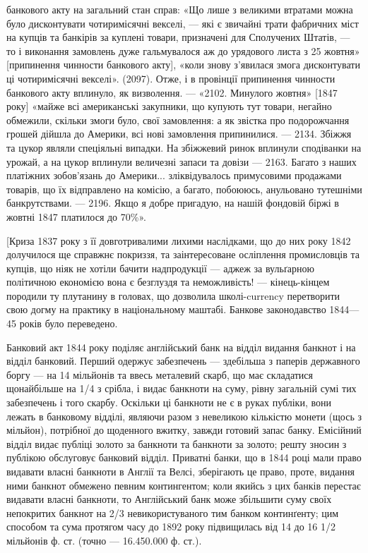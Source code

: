 банкового акту на загальний стан справ: «Що лише з великими втратами можна
було дисконтувати чотиримісячні векселі, — які є звичайні трати фабричних міст
на купців та банкірів за куплені товари, призначені для Сполучених Штатів, —
то і виконання замовлень дуже гальмувалося аж до урядового листа з 25 жовтня»
[припинення чинности банкового акту], «коли знову з’явилася змога дисконтувати
ці чотиримісячні векселі». (2097). Отже, і в провінції припинення чинности
банкового акту вплинуло, як визволення. — «2102. Минулого жовтня»
[1847 року] «майже всі американські закупники, що купують тут товари, негайно
обмежили, скільки змоги було, свої замовлення: а як звістка про подорожчання
грошей дійшла до Америки, всі нові замовлення припинилися. — 2134.
Збіжжя та цукор являли спеціяльні випадки. На збіжжевий ринок вплинули
сподіванки на урожай, а на цукор вплинули величезні запаси та довізи — 2163.
Багато з наших платіжних зобов’язань до Америки... зліквідувалось примусовими
продажами товарів, що їх відправлено на комісію, а багато, побоююсь,
анульовано тутешніми банкрутствами. — 2196. Якщо я добре пригадую, на нашій
фондовій біржі в жовтні 1847 платилося до 70\%».

[Криза 1837 року з її довготривалими лихими наслідками, що до них
року 1842 долучилося ще справжнє покриззя, та заінтересоване осліплення
промисловців та купців, що ніяк не хотіли бачити надпродукції — аджеж за
вульґарною політичною економією вона є безглуздя та неможливість! — кінець-кінцем
породили ту плутанину в головах, що дозволила школі-currency перетворити
свою догму на практику в національному маштабі. Банкове законодавство
1844—45 років було переведено.

Банковий акт 1844 року поділяє англійський банк на відділ видання банкнот
і на відділ банковий. Перший одержує забезпечень — здебільша з паперів державного
боргу — на 14 мільйонів та ввесь металевий скарб, що має складатися
щонайбільше на 1/4 з срібла, і видає банкноти на суму, рівну загальній сумі
тих забезпечень і того скарбу. Оскільки ці банкноти не є в руках публіки, вони
лежать в банковому відділі, являючи разом з невеликою кількістю монети (щось
з мільйон), потрібної до щоденного вжитку, завжди готовий запас банку. Емісійний
відділ видає публіці золото за банкноти та банкноти за золото; решту
зносин з публікою обслуговує банковий відділ. Приватні банки, що в 1844 році
мали право видавати власні банкноти в Англії та Велсі, зберігають це право,
проте, видання ними банкнот обмежено певним контингентом; коли якийсь з цих
банків перестає видавати власні банкноти, то Англійський банк може збільшити
суму своїх непокритих банкнот на 2/3 невикористуваного тим банком континґенту;
цим способом та сума протягом часу до 1892 року підвищилась від 14 до 16 1/2
мільйонів ф. ст. (точно — 16.450.000 ф. ст.).

